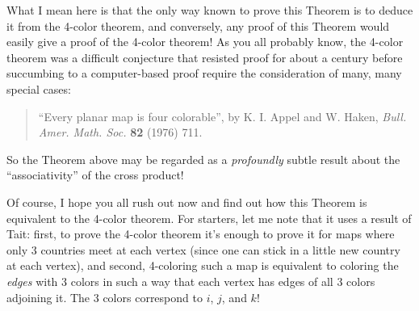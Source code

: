 \documentclass{article}
\begin{document}
What I mean here is that the only way known to prove this Theorem is to
deduce it from the 4-color theorem, and conversely, any proof of this
Theorem would easily give a proof of the 4-color theorem! As you all
probably know, the 4-color theorem was a difficult conjecture that
resisted proof for about a century before succumbing to a computer-based
proof require the consideration of many, many special cases:

\begin{quote}
``Every planar map is four colorable'', by K. I. Appel and W. Haken,
\emph{Bull. Amer. Math. Soc.} \textbf{82} (1976) 711.
\end{quote}

So the Theorem above may be regarded as a \emph{profoundly} subtle
result about the ``associativity'' of the cross product!

Of course, I hope you all rush out now and find out how this Theorem is
equivalent to the 4-color theorem. For starters, let me note that it
uses a result of Tait: first, to prove the 4-color theorem it's enough
to prove it for maps where only 3 countries meet at each vertex (since
one can stick in a little new country at each vertex), and second,
4-coloring such a map is equivalent to coloring the \emph{edges} with 3
colors in such a way that each vertex has edges of all 3 colors
adjoining it. The 3 colors correspond to \(i\), \(j\), and \(k\)!
\end{document}
